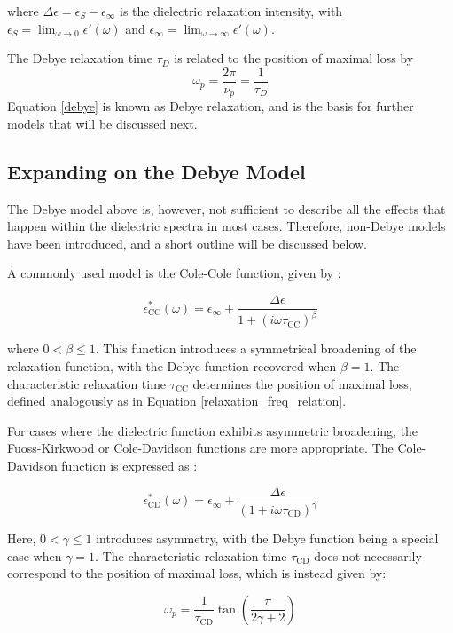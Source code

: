where \( \Delta \epsilon = \epsilon_S - \epsilon_\infty \) is the dielectric relaxation intensity, with \( \epsilon_S = \lim_{\omega \to 0} \epsilon'(\omega) \) and \( \epsilon_\infty = \lim_{\omega \to \infty} \epsilon'(\omega) \).

The Debye relaxation time \( \tau_D \) is related to the position of maximal loss by
\begin{equation}
\omega_p = \frac{2\pi}{\nu_p} = \frac{1}{\tau_D}
\label{relaxation_freq_relation}
\end{equation}
Equation \ref{debye} is known as Debye relaxation, and is the basis for further models that will be discussed next.
\subsection{Expanding on the Debye Model}
The Debye model above is, however, not sufficient to describe all the effects that happen within the dielectric spectra in most cases. Therefore, non-Debye models have been introduced, and a short outline will be discussed below.

A commonly used model is the Cole-Cole function, given by \cite{kremer2003}:

\[
\epsilon^*_{\text{CC}}(\omega) = \epsilon_\infty + \frac{\Delta \epsilon}{1 + (i \omega \tau_{\text{CC}})^\beta}
\]

where \( 0 < \beta \leq 1 \). This function introduces a symmetrical broadening of the relaxation function, with the Debye function recovered when \( \beta = 1 \). The characteristic relaxation time \( \tau_{\text{CC}} \) determines the position of maximal loss, defined analogously as in Equation \ref{relaxation_freq_relation}.



For cases where the dielectric function exhibits asymmetric broadening, the Fuoss-Kirkwood or Cole-Davidson functions are more appropriate. The Cole-Davidson function is expressed as \cite{kremer2003}:

\[
\epsilon^*_{\text{CD}}(\omega) = \epsilon_\infty + \frac{\Delta \epsilon}{(1 + i \omega \tau_{\text{CD}})^\gamma}
\]

Here, \( 0 < \gamma \leq 1 \) introduces asymmetry, with the Debye function being a special case when \( \gamma = 1 \). The characteristic relaxation time \( \tau_{\text{CD}} \) does not necessarily correspond to the position of maximal loss, which is instead given by:

\[
\omega_p = \frac{1}{\tau_{\text{CD}}} \tan\left(\frac{\pi}{2\gamma + 2}\right)
\]

